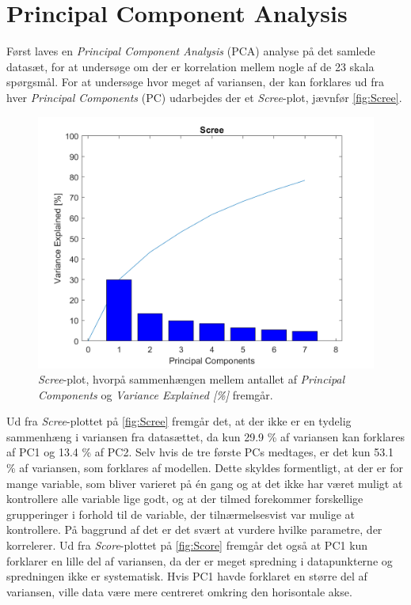 \section{Principal Component Analysis}
\label{DatabehandlingPCA}
%
Først laves en \textit{Principal Component Analysis} (PCA) analyse på det samlede datasæt, for at undersøge om der er korrelation mellem nogle af de 23 skala spørgsmål. For at undersøge hvor meget af variansen, der kan forklares ud fra hver \textit{Principal Components} (PC) udarbejdes der et \textit{Scree}-plot, jævnfør \autoref{fig:Scree}. 
%
\begin{figure}[H]
\centering
\includegraphics[width=\textwidth]{Figure/DatabehandlingSkalaer/PCAfigures/Scree.png}
\caption{\textit{Scree}-plot, hvorpå sammenhængen mellem antallet af \textit{Principal Components} og \textit{Variance Explained [\%]} fremgår.}
\label{fig:Scree}
\end{figure}
\noindent
%
Ud fra \textit{Scree}-plottet på \autoref{fig:Scree} fremgår det, at der ikke er en tydelig sammenhæng i variansen fra datasættet, da kun 29.9 \% af variansen kan forklares af PC1 og 13.4 \% af PC2. Selv hvis de tre første PCs medtages, er det kun 53.1 \% af variansen, som forklares af modellen. Dette skyldes formentligt, at der er for mange variable, som bliver varieret på én gang og at det ikke har været muligt at kontrollere alle variable lige godt, og at der tilmed forekommer forskellige grupperinger i forhold til de variable, der tilnærmelsesvist var mulige at kontrollere. På baggrund af det er det svært at vurdere hvilke parametre, der korrelerer.\blankline 
%
Ud fra \textit{Score}-plottet på \autoref{fig:Score} fremgår det også at PC1 kun forklarer en lille del af variansen, da der er meget spredning i datapunkterne og spredningen ikke er systematisk. Hvis PC1 havde forklaret en større del af variansen, ville data være mere centreret omkring den horisontale akse.

